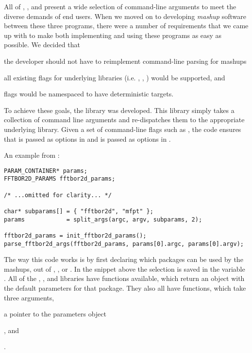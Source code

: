 \documentclass[11pt]{article}
\begin{document}

All of \fft, \rnamfpt, and \rnaeq present a wide selection of command-line arguments to meet the diverse demands of end users. When we moved on to developing {\em mashup} software between these three programs, there were a number of requirements that we came up with to make both implementing and using these programs as easy as possible. We decided that
\begin{inparaenum}
\item the developer should not have to reimplement command-line parsing for mashups
\item all existing flags for underlying libraries (i.e. \fft, \rnamfpt, \rnaeq) would be supported, and
\item flags would be namespaced to have deterministic targets.
\end{inparaenum}

To achieve these goals, the library \multiParam was developed. This library simply takes a collection of command line arguments and re-dispatches them to the appropriate underlying library. Given a set of command-line flags such as , the code ensures that \fft is passed  as options in  and \rnamfpt is passed  as options in .


An example from :

\begin{verbatim}
PARAM_CONTAINER* params;
FFTBOR2D_PARAMS fftbor2d_params;

/* ...omitted for clarity... */

char* subparams[] = { "fftbor2d", "mfpt" };
params            = split_args(argc, argv, subparams, 2);

fftbor2d_params = init_fftbor2d_params();
parse_fftbor2d_args(fftbor2d_params, params[0].argc, params[0].argv);
\end{verbatim}

The way this code works is by first declaring which packages can be used by the mashups, out of , , or . In the snippet above the selection is saved in the variable . All of the \fft, \rnamfpt, and \rnaeq libraries have  functions available, which return an object with the default parameters for that package. They also all have  functions, which take three arguments,
\begin{inparaenum}[\itshape 1\upshape)]
\item a pointer to the parameters object
\item {}, and
\item {}
\end{inparaenum}.
\end{document}
